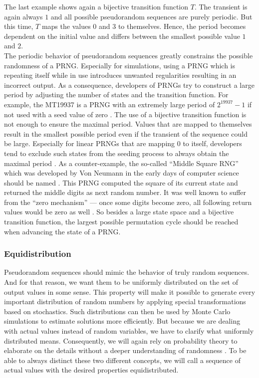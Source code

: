 \documentclass{stdlocal}
\begin{document}
  \noindent
  The last example shows again a bijective transition function $T$.
  The transient is again always $1$ and all possible pseudorandom sequences are purely periodic.
  But this time, $T$ maps the values $0$ and $3$ to themselves.
  Hence, the period becomes dependent on the initial value and differs between the smallest possible value $1$ and $2$.\\
  The periodic behavior of pseudorandom sequences greatly constrains the possible randomness of a PRNG.
  Especially for simulations, using a PRNG which is repeating itself while in use introduces unwanted regularities resulting in an incorrect output.
  As a consequence, developers of PRNGs try to construct a large period by adjusting the number of states and the transition function.
  For example, the MT19937 is a PRNG with an extremely large period of $2^{19937}-1$ if not used with a seed value of zero \autocite{matsumoto1998}.
  The use of a bijective transition function is not enough to ensure the maximal period.
  Values that are mapped to themselves result in the smallest possible period even if the transient of the sequence could be large.
  Especially for linear PRNGs that are mapping $0$ to itself, developers tend to exclude such states from the seeding process to always obtain the maximal period \autocite{marsaglia2003,blackman2019}.
  As a counter-example, the so-called \enquote{Middle Square RNG} which was developed by Von Neumann in the early days of computer science should be named \autocites[\ppno~12-15]{kneusel2018}{widynski2019}.
  This PRNG computed the square of its current state and returned the middle digits as next random number.
  It was well known to suffer from the \enquote{zero mechanism} --- once some digits become zero, all following return values would be zero as well \autocites[\ppno~12-15]{kneusel2018}{widynski2019}.
  So besides a large state space and a bijective transition function, the largest possible permutation cycle should be reached when advancing the state of a PRNG.

  \subsubsection{Equidistribution}
  Pseudorandom sequences should mimic the behavior of truly random sequences.
  And for that reason, we want them to be uniformly distributed on the set of output values in some sense.
  This property will make it possible to generate every important distribution of random numbers by applying special transformations based on stochastics.
  Such distributions can then be used by Monte Carlo simulations to estimate solutions more efficiently.
  But because we are dealing with actual values instead of random variables, we have to clarify what uniformly distributed means.
  Consequently, we will again rely on probability theory to elaborate on the details without a deeper understanding of randomness \autocite{eisner2019}.
  To be able to always distinct these two different concepts, we will call a sequence of actual values with the desired properties equidistributed.
\end{document}
